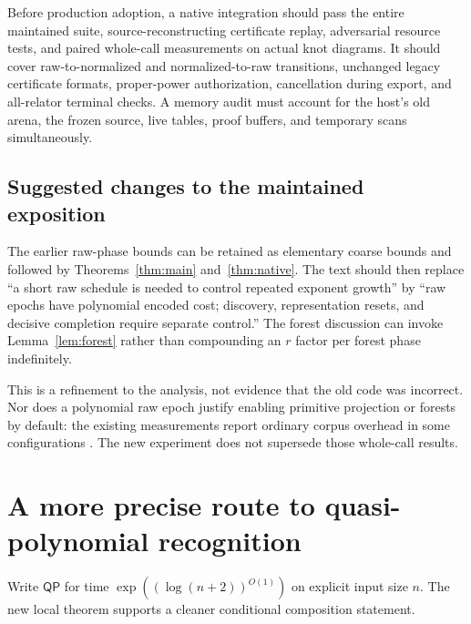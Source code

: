 \documentclass[11pt,letterpaper]{article}
\theoremstyle{definition}
\theoremstyle{remark}\newtheorem{remark}[theorem]{Remark}
\newcommand{\QP}{\mathsf{QP}}
\begin{document}
Before production adoption, a native integration should pass the entire
maintained suite, source-reconstructing certificate replay, adversarial
resource tests, and paired whole-call measurements on actual knot diagrams.
It should cover raw-to-normalized and normalized-to-raw transitions, unchanged
legacy certificate formats, proper-power authorization, cancellation during
export, and all-relator terminal checks. A memory audit must account for the
host's old arena, the frozen source, live tables, proof buffers, and temporary
scans simultaneously.

\subsection{Suggested changes to the maintained exposition}

The earlier raw-phase bounds can be retained as elementary coarse bounds and
followed by Theorems~\ref{thm:main} and~\ref{thm:native}. The text should then
replace ``a short raw schedule is needed to control repeated exponent growth''
by ``raw epochs have polynomial encoded cost; discovery, representation resets,
and decisive completion require separate control.'' The forest discussion can
invoke Lemma~\ref{lem:forest} rather than compounding an $r$ factor per forest
phase indefinitely.

This is a refinement to the analysis, not evidence that the old code was
incorrect. Nor does a polynomial raw epoch justify enabling primitive
projection or forests by default: the existing measurements report ordinary
corpus overhead in some configurations \cite{repo-projection,repo-forest}.
The new experiment does not supersede those whole-call results.

\section{A more precise route to quasi-polynomial recognition}
\label{sec:qp}

Write $\QP$ for time $\exp((\log(n+2))^{O(1)})$ on explicit input size $n$.
The new local theorem supports a cleaner conditional composition statement.
\end{document}
